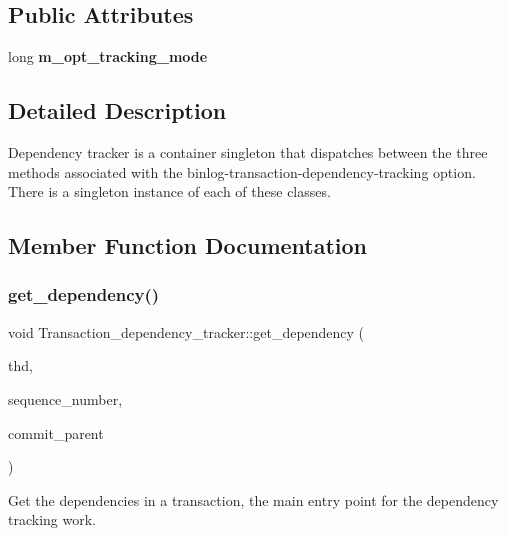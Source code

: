 \subsection*{Public Attributes}
\begin{DoxyCompactItemize}
\item 
\mbox{\label{classTransaction__dependency__tracker_a00ca767507c1463752c3736c1a3d487a}} 
long {\bfseries m\+\_\+opt\+\_\+tracking\+\_\+mode}
\end{DoxyCompactItemize}


\subsection{Detailed Description}
Dependency tracker is a container singleton that dispatches between the three methods associated with the binlog-\/transaction-\/dependency-\/tracking option. There is a singleton instance of each of these classes. 

\subsection{Member Function Documentation}
\mbox{\label{classTransaction__dependency__tracker_a8d2a4a5fbf55ca180fc23f4166be212f}} 
\subsubsection{\texorpdfstring{get\+\_\+dependency()}{get\_dependency()}}
{\footnotesize\ttfamily void Transaction\+\_\+dependency\+\_\+tracker\+::get\+\_\+dependency (\begin{DoxyParamCaption}\item[{T\+HD $\ast$}]{thd,  }\item[{int64 \&}]{sequence\+\_\+number,  }\item[{int64 \&}]{commit\+\_\+parent }\end{DoxyParamCaption})}

Get the dependencies in a transaction, the main entry point for the dependency tracking work. \mbox{\label{classTransaction__dependency__tracker_a8788b724314af256987da1595a3a42d7}} 
